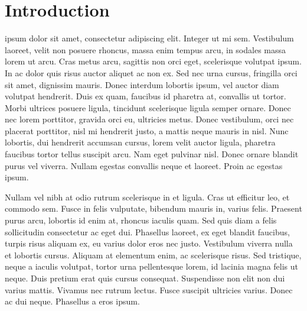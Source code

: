 \section{Introduction}\label{sec:10-intro}%
 ipsum dolor sit amet, consectetur adipiscing elit. Integer ut mi sem. Vestibulum laoreet, velit non posuere rhoncus, massa enim tempus arcu, in sodales massa lorem ut arcu. Cras metus arcu, sagittis non orci eget, scelerisque volutpat ipsum. In ac dolor quis risus auctor aliquet ac non ex. Sed nec urna cursus, fringilla orci sit amet, dignissim mauris. Donec interdum lobortis ipsum, vel auctor diam volutpat hendrerit. Duis ex quam, faucibus id pharetra at, convallis ut tortor. Morbi ultrices posuere ligula, tincidunt scelerisque ligula semper ornare. Donec nec lorem porttitor, gravida orci eu, ultricies metus. Donec vestibulum, orci nec placerat porttitor, nisl mi hendrerit justo, a mattis neque mauris in nisl. Nunc lobortis, dui hendrerit accumsan cursus, lorem velit auctor ligula, pharetra faucibus tortor tellus suscipit arcu. Nam eget pulvinar nisl. Donec ornare blandit purus vel viverra. Nullam egestas convallis neque et laoreet. Proin ac egestas ipsum.



Nullam vel nibh at odio rutrum scelerisque in et ligula. Cras ut efficitur leo, et commodo sem. Fusce in felis vulputate, bibendum mauris in, varius felis. Praesent purus arcu, lobortis id enim at, rhoncus iaculis quam. Sed quis diam a felis sollicitudin consectetur ac eget dui. Phasellus laoreet, ex eget blandit faucibus, turpis risus aliquam ex, eu varius dolor eros nec justo. Vestibulum viverra nulla et lobortis cursus. Aliquam at elementum enim, ac scelerisque risus. Sed tristique, neque a iaculis volutpat, tortor urna pellentesque lorem, id lacinia magna felis ut neque. Duis pretium erat quis cursus consequat. Suspendisse non elit non dui varius mattis. Vivamus nec rutrum lectus. Fusce suscipit ultricies varius. Donec ac dui neque. Phasellus a eros ipsum.

